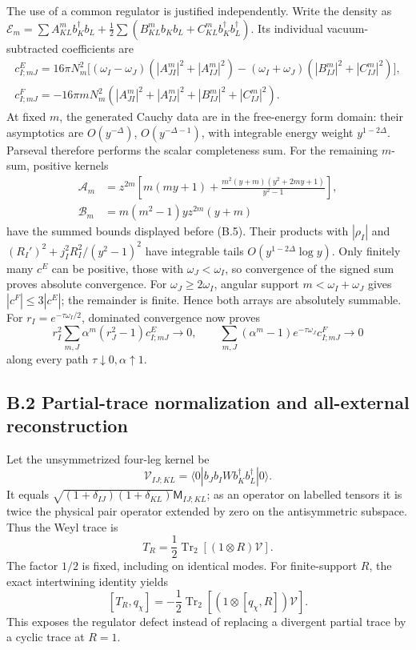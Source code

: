 \documentclass[a4paper,11pt]{article}
\numberwithin{equation}{section}
\begin{document}
The use of a common regulator is justified independently. Write the density as \(\mathcal E_m=\sum A^m_{KL}b_K^\dagger b_L+ \frac12\sum(B^m_{KL}b_Kb_L+C^m_{KL}b_K^\dagger b_L^\dagger)\). Its individual vacuum-subtracted coefficients are \[
\begin{aligned}
c^E_{I;mJ}=16\pi N_m^2\bigl[
(\omega_I-\omega_J)(|A^m_{JI}|^2+|A^m_{IJ}|^2)
-(\omega_I+\omega_J)(|B^m_{IJ}|^2+|C^m_{IJ}|^2)\bigr],\\
c^F_{I;mJ}=-16\pi mN_m^2
(|A^m_{JI}|^2+|A^m_{IJ}|^2+|B^m_{IJ}|^2+|C^m_{IJ}|^2).
\end{aligned}
\tag{B.7}
\] At fixed \(m\), the generated Cauchy data are in the free-energy form domain: their asymptotics are \(O(y^{-\Delta})\), \(O(y^{-\Delta-1})\), with integrable energy weight \(y^{1-2\Delta}\). Parseval therefore performs the scalar completeness sum. For the remaining \(m\)-sum, positive kernels \[
\begin{aligned}
\mathscr A_m&=z^{2m}\left[
m(my+1)+\frac{m^2(y+m)(y^2+2my+1)}{y^2-1}\right],\\
\mathscr B_m&=m(m^2-1)yz^{2m}(y+m)
\end{aligned}
\] have the summed bounds displayed before (B.5). Their products with \(|\rho_I|\) and \((R_I')^2+j_I^2R_I^2/(y^2-1)^2\) have integrable tails \(O(y^{1-2\Delta}\log y)\). Only finitely many \(c^E\) can be positive, those with \(\omega_J<\omega_I\), so convergence of the signed sum proves absolute convergence. For \(\omega_J\ge2\omega_I\), angular support \(m<\omega_I+\omega_J\) gives \(|c^F|\le3|c^E|\); the remainder is finite. Hence both arrays are absolutely summable. For \(r_I=e^{-\tau\omega_I/2}\), dominated convergence now proves \[
r_I^2\sum_{m,J}\alpha^m(r_J^2-1)c^E_{I;mJ}\longrightarrow0,
\qquad
\sum_{m,J}(\alpha^m-1)e^{-\tau\omega_J}c^F_{I;mJ}
\longrightarrow0
\tag{B.8}
\] along every path \(\tau\downarrow0,\alpha\uparrow1\).

\hypertarget{b.2-partial-trace-normalization-and-all-external-reconstruction}{%
\subsection{B.2 Partial-trace normalization and all-external reconstruction}\label{b.2-partial-trace-normalization-and-all-external-reconstruction}}

Let the unsymmetrized four-leg kernel be \[
\mathcal V_{IJ;KL}=\langle0|b_Jb_IWb_K^\dagger b_L^\dagger|0\rangle .
\] It equals \(\sqrt{(1+\delta_{IJ})(1+\delta_{KL})}\mathsf M_{IJ;KL}\); as an operator on labelled tensors it is twice the physical pair operator extended by zero on the antisymmetric subspace. Thus the Weyl trace is \[
T_R=\frac12\operatorname{Tr}_2[(1\otimes R)\mathcal V].
\tag{B.9}
\] The factor \(1/2\) is fixed, including on identical modes. For finite-support \(R\), the exact intertwining identity yields \[
[T_R,q_\chi]=-\frac12\operatorname{Tr}_2
[(1\otimes[q_\chi,R])\mathcal V].
\tag{B.10}
\] This exposes the regulator defect instead of replacing a divergent partial trace by a cyclic trace at \(R=1\).
\end{document}

